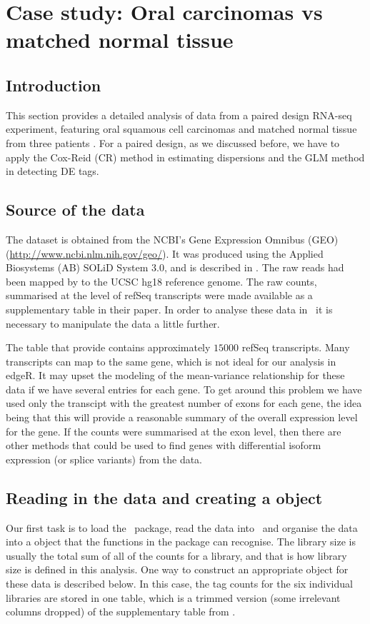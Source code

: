 
\section{Case study: Oral carcinomas vs matched normal tissue}\label{tuch}
\subsection{Introduction}
This section provides a detailed analysis of data from a paired design
RNA-seq experiment, featuring oral squamous cell carcinomas and
matched normal tissue from three patients \citep{Tuch:2010p457}. For a
paired design, as we discussed before, we have to apply the Cox-Reid
(CR) method in estimating dispersions and the GLM method in detecting
DE tags.

\subsection{Source of the data}
The dataset is obtained from the NCBI's Gene Expression Omnibus (GEO)
(\url{http://www.ncbi.nlm.nih.gov/geo/}). It was produced using the
Applied Biosystems (AB) SOLiD System 3.0, and is described in
\citet{Tuch:2010p457}. The raw reads had been mapped
by \citet{Tuch:2010p457} to the UCSC hg18 reference genome. The raw
counts, summarised at the level of refSeq transcripts were made
available as a supplementary table in their paper. In order
to analyse these data in \R\ it is necessary to manipulate the data a
little further.

The table that \citet{Tuch:2010p457} provide contains approximately $15
000$ refSeq transcripts. Many transcripts can map to the same gene,
which is not ideal for our analysis in edgeR. It may upset the
modeling of the mean-variance relationship for these data if we have
several entries for each gene. To get around this problem we have used
only the transcipt with the greatest number of exons for each gene,
the idea being that this will provide a reasonable summary of the
overall expression level for the gene. If the counts were summarised
at the exon level, then there are other methods that could be used to
find genes with differential isoform expression (or splice variants) from the data.

\subsection{Reading in the data and creating a  object}

Our first task is to load the \edgeR\ package, read the data into \R\
and organise the data into a  object that the
functions in the package can recognise. The library size is usually
the total sum of all of the counts for a library, and that is how
library size is defined in this analysis. One way to construct
an appropriate  object for these data is described
below. In this case, the tag counts for the six individual libraries
are stored in one table, which is a trimmed version (some irrelevant columns
dropped) of the supplementary table from \citet{Tuch:2010p457}.

